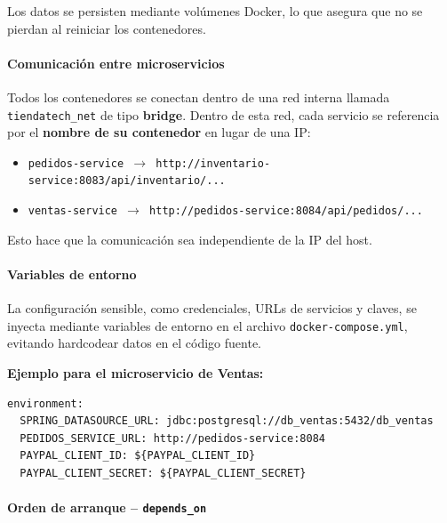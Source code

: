 \documentclass[12pt]{article}
\begin{document}
    Los datos se persisten mediante volúmenes Docker, lo que asegura que no se pierdan al reiniciar los contenedores.

    \paragraph{Comunicación entre microservicios}

    Todos los contenedores se conectan dentro de una red interna llamada \texttt{tiendatech\_net} de tipo \textbf{bridge}. Dentro de esta red, cada servicio se referencia por el \textbf{nombre de su contenedor} en lugar de una IP:

    \begin{tcolorbox}[colback=amarilloClaro,colframe=black,title=Ejemplos de comunicación interna]
        \begin{itemize}[leftmargin=1.5em]
    \item \texttt{pedidos-service $\rightarrow$ http://inventario-service:8083/api/inventario/...}
    \item \texttt{ventas-service $\rightarrow$ http://pedidos-service:8084/api/pedidos/...}
        \end{itemize}
    \end{tcolorbox}

    Esto hace que la comunicación sea independiente de la IP del host.

    \paragraph{Variables de entorno}

    La configuración sensible, como credenciales, URLs de servicios y claves, se inyecta mediante variables de entorno en el archivo \texttt{docker-compose.yml}, evitando hardcodear datos en el código fuente.

    \textbf{Ejemplo para el microservicio de Ventas:}

    \begin{lstlisting}[style=codigo]
environment:
  SPRING_DATASOURCE_URL: jdbc:postgresql://db_ventas:5432/db_ventas
  PEDIDOS_SERVICE_URL: http://pedidos-service:8084
  PAYPAL_CLIENT_ID: ${PAYPAL_CLIENT_ID}
  PAYPAL_CLIENT_SECRET: ${PAYPAL_CLIENT_SECRET}
    \end{lstlisting}

    \paragraph{Orden de arranque -- \texttt{depends\_on}}
\end{document}
